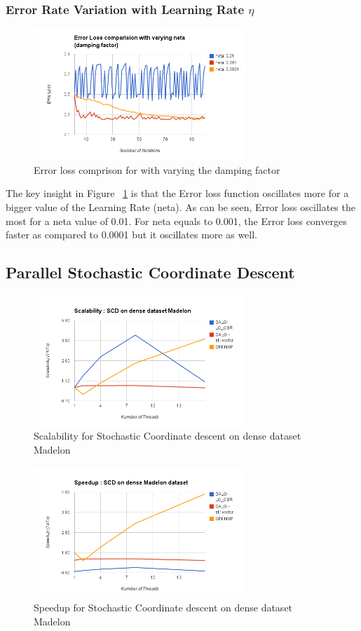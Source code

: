 \documentclass{sigplanconf}
\begin{document}
{	\subsubsection{Error Rate Variation with Learning Rate \(\eta\) }
\begin{figure}[ht!]
\centering
\includegraphics[width=80mm]{error_comparison.png}
\caption{Error loss comprison for with varying the damping factor }
\label{error_loss}
\end{figure}
	The key insight in Figure ~\ref{error_loss} is that the Error loss function oscillates more for a bigger value of the Learning Rate (neta).
	As can be seen, Error loss oscillates the most for a neta value of 0.01. For neta equals to 0.001, the Error loss converges faster
	as compared to 0.0001 but it oscillates more as well.

\subsection{Parallel Stochastic Coordinate Descent}

\begin{figure}[ht!]
\centering
\includegraphics[width=80mm]{scd_scale_dense.png}
\caption{Scalability for Stochastic Coordinate descent on dense dataset Madelon }
\label{fig:sc_scd_madelon}
\end{figure}

\begin{figure}[ht!]
\centering
\includegraphics[width=80mm]{scd_speed_dense.png}
\caption{Speedup for Stochastic Coordinate descent on dense dataset Madelon }
\label{fig:sp_scd_madelon}
\end{figure}

}
\end{document}
